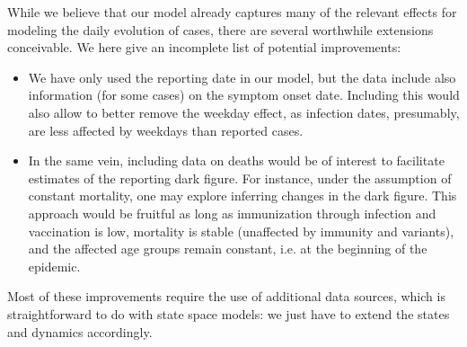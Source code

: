 While we believe that our model already captures many of the relevant effects for modeling the daily evolution of cases, there are several worthwhile extensions conceivable. We here give an incomplete list of potential improvements:
\begin{itemize}
    \item We have only used the reporting date in our model, but the data include also information (for some cases) on the symptom onset date. Including this would also allow to better remove the weekday effect, as infection dates, presumably, are less affected by weekdays than reported cases.
    \item In the same vein, including data on deaths would be of interest to facilitate estimates of the reporting dark figure. For instance, under the assumption of constant mortality, one may explore inferring changes in the dark figure. This approach would be fruitful as long as immunization through infection and vaccination is low, mortality is stable (unaffected by immunity and variants), and the affected age groups remain constant, i.e. at the beginning of the epidemic.
\end{itemize}

Most of these improvements require the use of additional data sources, which is straightforward to do with state space models: we just have to extend the states and dynamics accordingly. 
